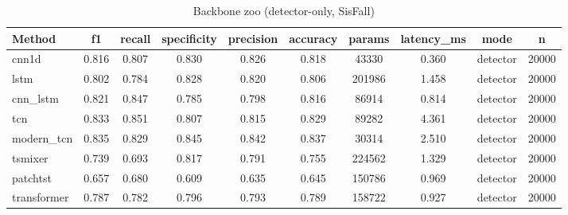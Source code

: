 \begin{table}[t]
\centering
\caption{Backbone zoo (detector-only, SisFall)}
\begin{tabular}{lccccccccc}
\toprule
Method & f1 & recall & specificity & precision & accuracy & params & latency_ms & mode & n \\
\midrule
cnn1d & 0.816 & 0.807 & 0.830 & 0.826 & 0.818 & 43330 & 0.360 & detector & 20000 \\
lstm & 0.802 & 0.784 & 0.828 & 0.820 & 0.806 & 201986 & 1.458 & detector & 20000 \\
cnn_lstm & 0.821 & 0.847 & 0.785 & 0.798 & 0.816 & 86914 & 0.814 & detector & 20000 \\
tcn & 0.833 & 0.851 & 0.807 & 0.815 & 0.829 & 89282 & 4.361 & detector & 20000 \\
modern_tcn & 0.835 & 0.829 & 0.845 & 0.842 & 0.837 & 30314 & 2.510 & detector & 20000 \\
tsmixer & 0.739 & 0.693 & 0.817 & 0.791 & 0.755 & 224562 & 1.329 & detector & 20000 \\
patchtst & 0.657 & 0.680 & 0.609 & 0.635 & 0.645 & 150786 & 0.969 & detector & 20000 \\
transformer & 0.787 & 0.782 & 0.796 & 0.793 & 0.789 & 158722 & 0.927 & detector & 20000 \\
\bottomrule
\end{tabular}
\end{table}